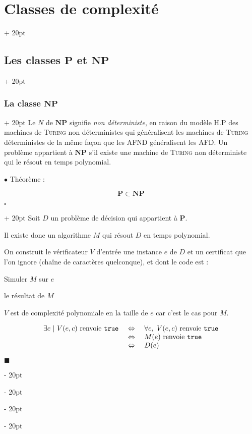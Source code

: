 \documentclass[a4paper, 12pt, twoside]{article}
\newenvironment{indalgo}[2][H]{
    \begin{algoBox}
        \begin{algorithm}[#1]
            \caption{#2}
}
{
        \end{algorithm}
    \end{algoBox}
}
\newcommand{\ssi}{\ \Leftrightarrow \ }
\newcommand{\ind}[1][20pt]{\advance\leftskip + #1}
\newcommand{\deind}[1][20pt]{\advance\leftskip - #1}
\newenvironment{indt}[2][20pt]{#2 \par \ind[#1]}{\par \deind} %
\newenvironment{proof}[1][{}]{\begin{indt}{$\square$ #1}}{$\blacksquare$ \end{indt}}
\begin{document}
\begin{indt}{\section{Classes de complexité}}
\begin{indt}{\subsection{Les classes $\mathbf P$ et $\mathbf{NP}$}}
\begin{indt}{\subsubsection{La classe $\mathbf{NP}$}}
                Le $N$ de $\mathbf{NP}$ signifie \emph{non déterministe}, en raison du modèle H.P des machines de \textsc{Turing} non déterministes qui généralisent les machines de \textsc{Turing} déterministes de la même façon que les AFND généralisent les AFD.
                Un problème appartient à $\mathbf{NP}$ s'il existe une machine de \textsc{Turing} non déterministe qui le résout en temps polynomial.

                \vspace{12pt}
                
                $\bullet$ Théorème :
                \begin{emphBox}
                    \[
                        \mathbf P \subset \mathbf{NP}
                    \]
                \end{emphBox}

                \vspace{6pt}
                
                \begin{proof}
                    Soit $D$ un problème de décision qui appartient à $\mathbf P$.

                    Il existe donc un algorithme $M$ qui résout $D$ en temps polynomial.

                    On construit le vérificateur $V$ d'entrée une instance $e$ de $D$ et un certificat que l'on ignore (chaîne de caractères quelconque), et dont le code est :

                    \begin{indalgo}{$V$}

                        \BlankLine

                        Simuler $M$ sur $e$\;

                        \Return le résultat de $M$\;
                    \end{indalgo}

                    $V$ est de complexité polynomiale en la taille de $e$ car c'est le cas pour $M$.

                    \[
                        \begin{array}{rcl}
                            \exists c\ |\ V(e, c)\ \text{renvoie \texttt{true}}
                            &\ssi&
                            \forall c,\ V(e, c)\ \text{renvoie \texttt{true}}
                            \\
                            &\ssi& M(e)\ \text{renvoie \texttt{true}}
                            \\
                            &\ssi& D(e)
                        \end{array}
                    \]


\end{proof}
\end{indt}
\end{indt}
\end{indt}
\end{document}
